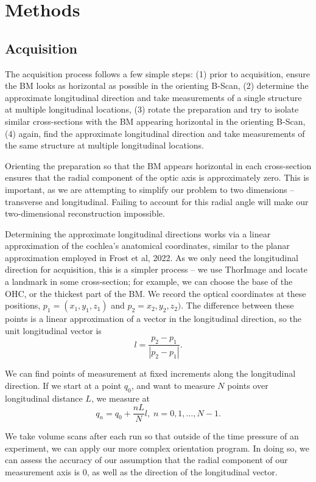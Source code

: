 \documentclass[aip,cp,amsmath,amssymb,reprint]{revtex4-2}
\begin{document}
\section{\label{sec:methods}Methods}

\subsection{\label{sec:acquisition}Acquisition}
\par{The acquisition process follows a few simple steps: (1) prior to acquisition, ensure the BM looks as horizontal as possible in the orienting B-Scan, (2) determine the approximate longitudinal direction and take measurements of a single structure at multiple longitudinal locations, (3) rotate the preparation and try to isolate similar cross-sections with the BM appearing horizontal in the orienting B-Scan, (4) again, find the approximate longitudinal direction and take measurements of the same structure at multiple longitudinal locations.}
\par{Orienting the preparation so that the BM appears horizontal in each cross-section ensures that the radial component of the optic axis is approximately zero. This is important, as we are attempting to simplify our problem to two dimensions – transverse and longitudinal. Failing to account for this radial angle will make our two-dimensional reconstruction impossible.}
\par{Determining the approximate longitudinal directions works via a linear approximation of the cochlea’s anatomical coordinates, similar to the planar approximation employed in Frost et al, 2022. As we only need the longitudinal direction for acquisition, this is a simpler process – we use ThorImage and locate a landmark in some cross-section; for example, we can choose the base of the OHC, or the thickest part of the BM. We record the optical coordinates at these positions, $p_1 = (x_1,y_1,z_1)$ and $p_2 = x_2, y_2, z_2)$. The difference between these points is a linear approximation of a vector in the longitudinal direction, so the unit longitudinal vector is
	\begin{equation}
		\label{eqn:lunit}
		l = \frac{p_2-p_1}{|p_2-p_1|}.
	\end{equation}
}
\par{We can find points of measurement at fixed increments along the longitudinal direction. If we start at a point $q_0$, and want to measure $N$ points over longitudinal distance $L$, we measure at 
	\begin{equation}
		\label{eqn:points}
		q_n = q_0 + \frac{nL}{N}l,\;n=0,1,\ldots,N-1.
	\end{equation}
}
\par{We take volume scans after each run so that outside of the time pressure of an experiment, we can apply our more complex orientation program\cite{frost2022}. In doing so, we can assess the accuracy of our assumption that the radial component of our measurement axis is 0, as well as the direction of the longitudinal vector.}
\end{document}
